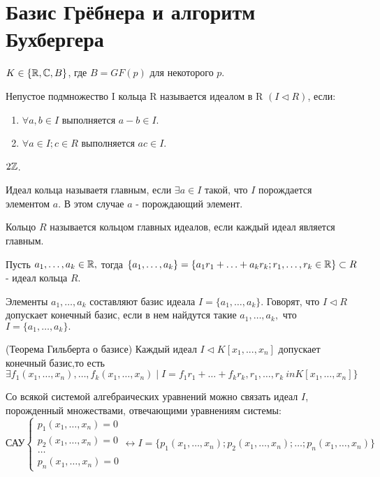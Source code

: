 \section {Базис Грёбнера и алгоритм Бухбергера}

$ K \in \{ \mathbb{R}, \mathbb{C}, B\} $, где $B = GF(p)$ для некоторого $p$.

\opr Непустое подмножество I кольца R называется идеалом в R $(I \triangleleft R)$, если:
\begin{enumerate}
	\item $\forall a,b \in I$ выполняется $a - b \in I$. 
	\item $\forall a \in I; c \in R$ выполняется $ac \in I$.
\end{enumerate}

\example $2\mathbb{Z}$.

\opr Идеал кольца называетя главным, если $\exists a \in I$ такой, что $I$ порождается элементом $a$. В этом случае $a$ - порождающий элемент.

\opr Кольцо $R$ называется кольцом главных идеалов, если каждый идеал является главным.

\utv Пусть $a_1,\ldots,a_k \in \mathbb{R},$ тогда $\{a_1,\ldots,a_k\} = \{ a_1r_1+\ldots+a_kr_k; r_1,\ldots,r_k \in \mathbb{R}\} \subset R$ - идеал кольца $R$.

\opr Элементы $a_1,\ldots,a_k$ составляют базис идеала $I = \{a_1,\ldots,a_k\}.$ Говорят, что $I \triangleleft R$ допускает конечный базис, если в нем найдутся такие $a_1,\ldots,a_k,$ что $I = \{a_1,\ldots,a_k\}.$

\thri (Теорема Гильберта о базисе) Каждый идеал $I \triangleleft K[x_1,...,x_n]$ допускает конечный базис,то есть $\exists  f_1(x_1,\ldots,x_n),\ldots,f_k(x_1,\ldots,x_n) \mid I = f_1r_1 + \ldots + f_kr_k, r_1,\ldots,r_k \ in K[x_1,\ldots,x_n]\}$

Со всякой системой алгебраических уравнений можно связать идеал $I$, порожденный множествами, отвечающими уравнениям системы:
\begin{equation*}
	\text{САУ}
	\begin{cases}
	   	p_1(x_1,\ldots,x_n) = 0\\
	   	p_2(x_1,\ldots,x_n) = 0\\
		\ldots\\
		p_n(x_1,\ldots,x_n) = 0
	\end{cases}
	\leftrightarrow I = \{p_1(x_1,\ldots,x_n);p_2(x_1,\ldots,x_n);\ldots;p_n(x_1,\ldots,x_n)\}
\end{equation*}

